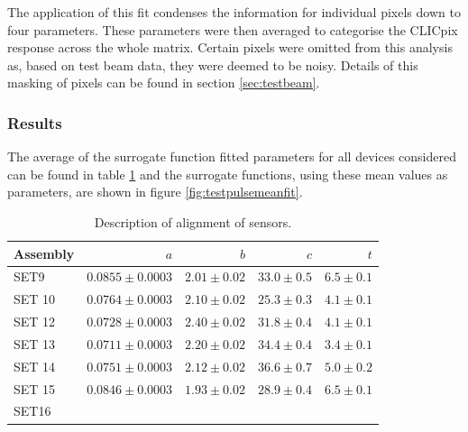 The application of this fit condenses the information for individual pixels down to four parameters.  These parameters were then averaged to categorise the CLICpix response across the whole matrix.  Certain pixels were omitted from this analysis as, based on test beam data, they were deemed to be noisy.  Details of this masking of pixels can be found in section \ref{sec:testbeam}.


\subsubsection{Results }

The average of the surrogate function fitted parameters for all devices considered can be found in table \ref{table:clicpixfitparams} and the surrogate functions, using these mean values as parameters, are shown in figure \ref{fig:testpulsemeanfit}.

\begin{table}[h!]
\centering
\begin{tabular}{ l r r r r}
\hline
Assembly & $a$ & $b$ & $c$ & $t$ \\ 
\hline
SET9 & $0.0855 \pm 0.0003$ & $2.01 \pm 0.02$ & $33.0 \pm 0.5$ & $6.5 \pm 0.1$ \\
SET 10 & $0.0764 \pm 0.0003$ & $2.10 \pm 0.02$ & $25.3 \pm 0.3$ & $4.1 \pm 0.1$ \\
SET 12 & $0.0728 \pm 0.0003$ & $2.40 \pm 0.02$ & $31.8 \pm 0.4$ & $4.1 \pm 0.1$ \\
SET 13 & $0.0711 \pm 0.0003$ & $2.20 \pm 0.02$ & $34.4 \pm 0.4$ & $3.4 \pm 0.1$ \\
SET 14 & $0.0751 \pm 0.0003$ & $2.12 \pm 0.02$ & $36.6 \pm 0.7$ & $5.0 \pm 0.2$ \\
SET 15 & $0.0846 \pm 0.0003$ & $1.93 \pm 0.02$ & $28.9 \pm 0.4$ & $6.5 \pm 0.1$\\
SET16  & & & &\\
\hline
\end{tabular}
\caption[Description of alignment of sensors.]{Description of alignment of sensors.}
\label{table:clicpixfitparams}
\end{table}

